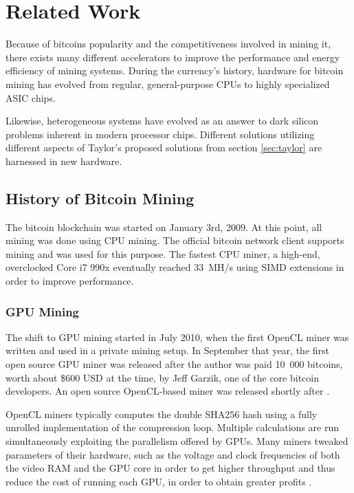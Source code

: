 \chapter{Related Work}
\label{cha:related-work}


Because of bitcoins popularity and the competitiveness involved in mining it, there exists
many different accelerators to improve the performance and energy efficiency of mining systems.
During the currency's history, hardware for bitcoin mining has evolved from regular, general-purpose
CPUs to highly specialized ASIC chips.

Likewise, heterogeneous systems have evolved as an answer to dark silicon problems inherent in
modern processor chips. Different solutions utilizing different aspects of Taylor's proposed
solutions from section \ref{sec:taylor} are harnessed in new hardware.

\section{History of Bitcoin Mining}

The bitcoin blockchain was started on January 3rd, 2009. At this point, all mining was done
using CPU mining. The official bitcoin network client supports mining and was used for this
purpose. The fastest CPU miner, a high-end, overclocked Core i7 990x eventually reached 33~MH/s
using SIMD extensions in order to improve performance. \cite{bitcoin-history}

\subsection{GPU Mining}
The shift to GPU mining started in July 2010, when the first OpenCL miner was written and
used in a private mining setup. In September that year, the first open source GPU miner
was released after the author was paid 10~000 bitcoins, worth about \$600 USD at the time,
by Jeff Garzik, one of the core bitcoin developers. An open source OpenCL-based miner was
released shortly after \cite{bitcoin-history}.

OpenCL miners typically computes the double SHA256 hash using a fully unrolled implementation
of the compression loop. Multiple calculations are run simultaneously exploiting the parallelism
offered by GPUs. Many miners tweaked parameters of their hardware, such as the voltage and
clock frequencies of both the video RAM and the GPU core in order to get higher throughput
and thus reduce the cost of running each GPU, in order to obtain greater profits \cite{bespoke-silicon}.

